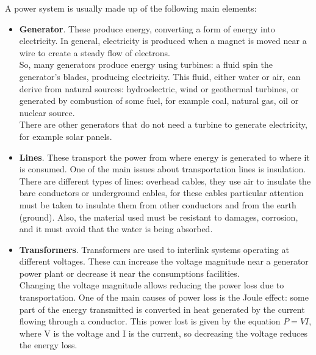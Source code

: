 \noindent A power system is usually made up of the following main elements: \label{networkeledesc}
\begin{itemize}
    \item \textbf{Generator}. These produce energy, converting a form of energy into electricity. In general, electricity is produced when a magnet is moved near a wire to create a steady flow of electrons.\\
    So, many generators produce energy using turbines: a fluid spin the generator's blades, producing electricity. This fluid, either water or air, can derive from natural sources: hydroelectric, wind or geothermal turbines, or generated by combustion of some fuel, for example coal, natural gas, oil or nuclear source. \\
    There are other generators that do not need a turbine to generate electricity, for example solar panels.
    
    \item \textbf{Lines}. These transport the power from where energy is generated to where it is consumed. One of the main issues about transportation lines is insulation. \\
    There are different types of lines: overhead cables, they use air to insulate the bare conductors or underground cables, for these cables particular attention must be taken to insulate them from other conductors and from the earth (ground). Also, the material used must be resistant to damages, corrosion, and it must avoid that the water is being absorbed.
    
    \item \textbf{Transformers}. Transformers are used to interlink systems operating at different voltages. These can increase  the voltage magnitude near a generator power plant or decrease it near the consumptions facilities. \\
    Changing the voltage magnitude allows reducing the power loss due to transportation. One of the main causes of power loss is the Joule effect: some part of the energy transmitted is converted in heat generated by the current flowing through a conductor. This power lost is given by the equation $P=VI$, where \gls{V} is the voltage and \gls{I} is the current, so decreasing the voltage reduces the energy loss.
    

\end{itemize}
